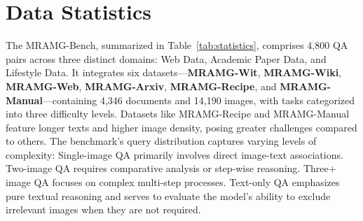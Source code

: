 \section{Data Statistics}
\label{sec:statistics}

The MRAMG-Bench, summarized in Table~\ref{tab:statistics}, comprises 4,800 QA pairs across three distinct domains: Web Data, Academic Paper Data, and Lifestyle Data. 
It integrates six datasets—\textbf{MRAMG-Wit}, \textbf{MRAMG-Wiki}, \textbf{MRAMG-Web}, \textbf{MRAMG-Arxiv}, \textbf{MRAMG-Recipe}, and \textbf{MRAMG-Manual}—containing 4,346 documents and 14,190 images, with tasks categorized into three difficulty levels. 
Datasets like MRAMG-Recipe and MRAMG-Manual feature longer texts and higher image density, posing greater challenges compared to others.
The benchmark's query distribution captures varying levels of complexity:
Single-image QA primarily involves direct image-text associations.
Two-image QA requires comparative analysis or step-wise reasoning.
Three+ image QA focuses on complex multi-step processes.
Text-only QA emphasizes pure textual reasoning and serves to evaluate the model's ability to exclude irrelevant images when they are not required.


